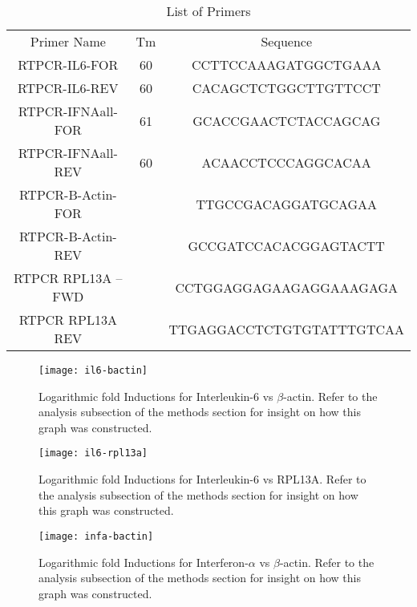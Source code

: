 \documentclass[journal, a4paper]{IEEEtran}
\begin{document}
  \begin{table}[!hbt]
    \begin{center}
    \caption{List of Primers}
    \label{tab:simParameters}
    \begin{tabular}{|c|c|c|}
      \hline
      Primer Name & Tm & Sequence \\
      RTPCR-IL6-FOR & 60 & CCTTCCAAAGATGGCTGAAA \\
      \hline
      RTPCR-IL6-REV & 60 & CACAGCTCTGGCTTGTTCCT \\
      \hline
      RTPCR-IFNAall-FOR & 61 & GCACCGAACTCTACCAGCAG \\
      \hline
      RTPCR-IFNAall-REV & 60 & ACAACCTCCCAGGCACAA \\
      \hline
      RTPCR-B-Actin-FOR & & TTGCCGACAGGATGCAGAA \\
      \hline
      RTPCR-B-Actin-REV & & GCCGATCCACACGGAGTACTT \\
      \hline
      RTPCR RPL13A –FWD & & CCTGGAGGAGAAGAGGAAAGAGA \\
      \hline
      RTPCR RPL13A REV & & TTGAGGACCTCTGTGTATTTGTCAA \\
      \hline
    \end{tabular}
    \end{center}
  \end{table}

  \begin{figure}[t]
    \centering
    \texttt{[image: il6-bactin]}
    \caption{Logarithmic fold Inductions for Interleukin-6 vs $\beta$-actin.
    Refer to the analysis subsection of the methods section for insight on how this graph was constructed.
    }
    \label{fig:mesh1}
  \end{figure}

  \begin{figure}[t]
    \centering
    \texttt{[image: il6-rpl13a]}
    \caption{Logarithmic fold Inductions for Interleukin-6 vs RPL13A.
    Refer to the analysis subsection of the methods section for insight on how this graph was constructed.
    }
    \label{fig:mesh1}
  \end{figure}

  \begin{figure}[t]
    \centering
    \texttt{[image: infa-bactin]}
    \caption{Logarithmic fold Inductions for Interferon-$\alpha$ vs $\beta$-actin.
    Refer to the analysis subsection of the methods section for insight on how this graph was constructed.
    }
    \label{fig:mesh1}
  \end{figure}
\end{document}
